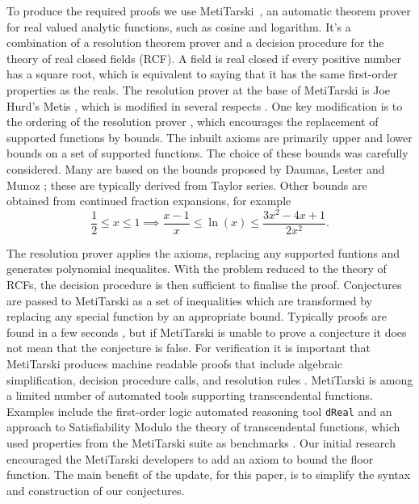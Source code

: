 \documentclass{fac}
\begin{document}
To produce the required proofs we use MetiTarski~\cite{akbarpour2010metitarski}, an automatic theorem prover for real valued analytic functions, such as cosine and logarithm. It's a combination of a resolution theorem prover and a decision procedure for the theory of real closed fields (RCF). A field is real closed if every positive number has a square root, which is equivalent to saying that it has the same first-order properties as the reals. The resolution prover at the base of MetiTarski is Joe Hurd's Metis \cite{metis_theorem_prover}, which is modified in several respects \cite{akbarpour2008metitarski}. One key modification is to the ordering of the resolution prover \cite{ludwig2007extension}, which encourages the replacement of supported functions by bounds. The inbuilt axioms are primarily upper and lower bounds on a set of supported functions. The choice of these bounds was carefully considered. Many are based on the bounds proposed by Daumas, Lester and Munoz \cite{daumas2008verified}; these are typically derived from Taylor series. Other bounds are obtained from continued fraction expansions, for example
\[\frac{1}{2} \leq x \leq 1 \implies \frac{x-1}{x} \leq \ln(x) \leq \frac{3x^2-4x+1}{2x^2}.\]

The resolution prover applies the axioms, replacing any supported funtions and generates polynomial inequalites. With the problem reduced to the theory of RCFs, the decision procedure is then sufficient to finalise the proof. Conjectures are passed to MetiTarski as a set of inequalities which are transformed by replacing any special function by an appropriate bound. Typically proofs are found in a few seconds \cite{akbarpour2009applications}, but if MetiTarski is unable to prove a conjecture it does not mean that the conjecture is false. For verification it is important that MetiTarski produces machine readable proofs that include algebraic simplification, decision procedure calls, and resolution rules \cite{denman2009formal}. MetiTarski is among a limited number of automated tools supporting transcendental functions. Examples include the first-order logic automated reasoning tool \texttt{dReal} \cite{gao2013dreal} and an approach to Satisfiability Modulo the theory of transcendental functions, which used properties from the MetiTarski suite as benchmarks \cite{cimatti2017satisfiability}. Our initial research encouraged the MetiTarski developers to add an axiom to bound the floor function. The main benefit of the update, for this paper, is to simplify the syntax and construction of our conjectures.  
\end{document}
